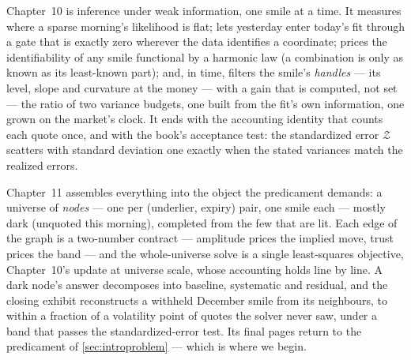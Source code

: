 Chapter~10 is inference under weak information, one smile at a time.
It measures where a sparse morning's likelihood is flat; lets
yesterday enter today's fit through a gate that is exactly zero
wherever the data identifies a coordinate; prices the
identifiability of any smile functional by a harmonic law (a
combination is only as known as its least-known part); and, in
time, filters the smile's \emph{handles} --- its level, slope and
curvature at the money --- with a gain that is computed, not
set --- the ratio of two variance budgets, one built from the fit's
own information, one grown on the market's clock.  It ends with the
accounting identity that counts each quote once, and with the book's
acceptance test: the standardized error $\mathcal{Z}$ scatters with
standard deviation one exactly when the stated variances match the
realized errors.

Chapter~11 assembles everything into the object the predicament
demands: a universe of \emph{nodes} --- one per (underlier, expiry)
pair, one smile each --- mostly dark (unquoted this morning),
completed from the few
that are lit.  Each edge of the graph is a two-number contract ---
amplitude prices the implied move, trust prices the band --- and the
whole-universe solve is a single least-squares objective,
Chapter~10's update at universe scale, whose accounting holds line
by line.  A dark node's answer decomposes into baseline, systematic
and residual, and the closing exhibit reconstructs a withheld
December smile from its neighbours, to within a fraction of a
volatility point of quotes the solver never saw, under a band that
passes the standardized-error test.  Its final pages return to the
predicament of \cref{sec:introproblem} --- which is where we begin.
